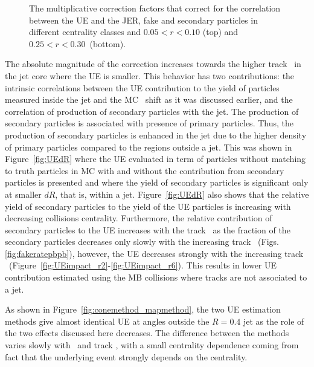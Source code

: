 \begin{figure}
\begin{subfigure}{1.\textwidth}
\caption{}
\label{fig:UEweights_r6}
\end{subfigure}
\caption{The multiplicative correction factors that correct for the correlation between the UE and the JER, fake and secondary particles in different centrality classes and \mbox{$ 0.05 < r < 0.10$} (top) and \mbox{$ 0.25 < r < 0.30$ (bottom)}.}
\label{fig:UEweights}
\end{figure}



The absolute magnitude of the correction increases towards the higher track \pt\ in the jet core where the UE is smaller.
This behavior has two contributions: the intrinsic correlations between the UE contribution to the yield of particles measured inside the jet and the MC \pTjet\ shift as it was discussed earlier, and the correlation of production of secondary particles with the jet.
The production of secondary particles is associated with presence of primary particles.
Thus, the production of secondary particles is enhanced in the jet due to the higher density of primary particles compared to the regions outside a jet.
This was shown in Figure~\ref{fig:UEdR} where the UE evaluated in term of particles without matching to truth particles in MC with and without the contribution from secondary particles is presented and where the yield of secondary particles is significant only at smaller $dR$, that is, within a jet.
Figure~\ref{fig:UEdR} also shows that the relative yield of secondary particles to the yield of the UE particles is increasing with decreasing collisions centrality.
Furthermore, the relative contribution of secondary particles to the UE increases with the track \pT\ as the fraction of the secondary particles decreases only slowly with the increasing track \pT\ (Figs.\ref{fig:fakeratepbpb}), however, the UE decreases strongly with the increasing track \pT\ (Figure~\ref{fig:UEimpact_r2}-\ref{fig:UEimpact_r6}).
This results in lower UE contribution estimated using the MB collisions where tracks are not associated to a jet.


As shown in Figure~\ref{fig:conemethod_mapmethod}, the two UE estimation methods give almost identical UE at angles outside the $R=0.4$ jet as the role of the two effects discussed here decreases.
The difference between the methods varies slowly with \ptjet\ and track \pT, with a small centrality dependence coming from fact that the underlying event strongly depends on the centrality.

